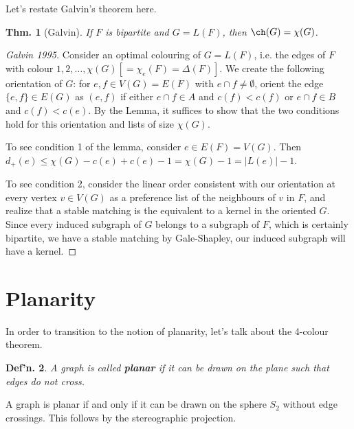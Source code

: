 \documentclass[12pt, a4paper]{book}
\newtheorem{theorem}{Thm.}[section]
\newtheorem{definition}[theorem]{Def'n.}
\theoremstyle{nonumberplain}
\newtheorem{proof}{Proof}
\begin{document}
Let's restate Galvin's theorem here.
\begin{theorem}[Galvin]
    If $F$ is bipartite and $G=L(F)$, then $\ch(G)=\chi(G)$.
\end{theorem}
\begin{center}
\end{center}
\begin{proof}[Galvin 1995]
    Consider an optimal colouring of $G=L(F)$, i.e. the edges of $F$ with colour $1,2,\ldots,\chi(G)[=\chi_e(F)=\Delta(F)]$.
    We create the following orientation of $G$: for $e,f\in V(G)=E(F)$ with $e\cap f\neq\emptyset$, orient the edge $\{e,f\}\in E(G)$ as $(e,f)$ if either $e\cap f\in A$ and $c(f)<c(f)$ or $e\cap f\in B$ and $c(f)<c(e)$.
    By the Lemma, it suffices to show that the two conditions hold for this orientation and lists of size $\chi(G)$.

    To see condition 1 of the lemma, consider $e\in E(F)=V(G)$.
    Then $d_+(e)\leq\chi(G)-c(e)+c(e)-1=\chi(G)-1=|L(e)|-1$.

    To see condition 2, consider the linear order consistent with our orientation at every vertex $v\in V(G)$ as a preference list of the neighbours of $v$ in $F$, and realize that a stable matching is the equivalent to a kernel in the oriented $G$.
    Since every induced subgraph of $G$ belongs to a subgraph of $F$, which is certainly bipartite, we have a stable matching by Gale-Shapley, our induced subgraph will have a kernel.
\end{proof}
\section{Planarity}
In order to transition to the notion of planarity, let's talk about the 4-colour theorem.
\begin{definition}
    A graph is called \textbf{planar} if it can be drawn on the plane such that edges do not cross.
\end{definition}
A graph is planar if and only if it can be drawn on the sphere $S_2$ without edge crossings.
This follows by the stereographic projection.
\end{document}
